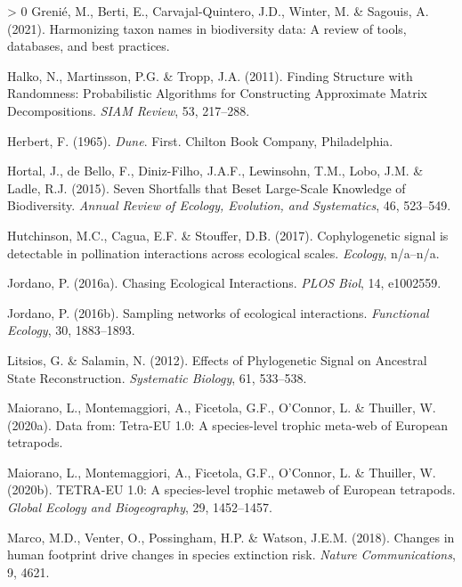 \documentclass[10pt,oneside]{article}
\newlength{\cslhangindent}
\newenvironment{CSLReferences}[3] %
 {%
  \setlength{\parindent}{0pt}
  \ifodd #1 \everypar{\setlength{\hangindent}{\cslhangindent}}\ignorespaces\fi
  \ifnum #2 > 0
  \setlength{\parskip}{#2\baselineskip}
  \fi
 }%
 {}
\begin{document}
\begin{CSLReferences}{1}{0}
\leavevmode\hypertarget{ref-Grenie2021HarTax}{}%
Grenié, M., Berti, E., Carvajal-Quintero, J.D., Winter, M. \& Sagouis,
A. (2021). Harmonizing taxon names in biodiversity data: A review of
tools, databases, and best practices.

\leavevmode\hypertarget{ref-Halko2011FinStr}{}%
Halko, N., Martinsson, P.G. \& Tropp, J.A. (2011). Finding Structure
with Randomness: Probabilistic Algorithms for Constructing Approximate
Matrix Decompositions. \emph{SIAM Review}, 53, 217--288.

\leavevmode\hypertarget{ref-Herbert1965Dun}{}%
Herbert, F. (1965). \emph{Dune}. First. Chilton Book Company,
Philadelphia.

\leavevmode\hypertarget{ref-Hortal2015SevSho}{}%
Hortal, J., de Bello, F., Diniz-Filho, J.A.F., Lewinsohn, T.M., Lobo,
J.M. \& Ladle, R.J. (2015). Seven Shortfalls that Beset Large-Scale
Knowledge of Biodiversity. \emph{Annual Review of Ecology, Evolution,
and Systematics}, 46, 523--549.

\leavevmode\hypertarget{ref-Hutchinson2017CopSig}{}%
Hutchinson, M.C., Cagua, E.F. \& Stouffer, D.B. (2017). Cophylogenetic
signal is detectable in pollination interactions across ecological
scales. \emph{Ecology}, n/a--n/a.

\leavevmode\hypertarget{ref-Jordano2016ChaEco}{}%
Jordano, P. (2016a). Chasing Ecological Interactions. \emph{PLOS Biol},
14, e1002559.

\leavevmode\hypertarget{ref-Jordano2016SamNet}{}%
Jordano, P. (2016b). Sampling networks of ecological interactions.
\emph{Functional Ecology}, 30, 1883--1893.

\leavevmode\hypertarget{ref-Litsios2012EffPhy}{}%
Litsios, G. \& Salamin, N. (2012). Effects of Phylogenetic Signal on
Ancestral State Reconstruction. \emph{Systematic Biology}, 61, 533--538.

\leavevmode\hypertarget{ref-Maiorano2020DatTet}{}%
Maiorano, L., Montemaggiori, A., Ficetola, G.F., O'Connor, L. \&
Thuiller, W. (2020a). Data from: Tetra-EU 1.0: A species-level trophic
meta-web of European tetrapods.

\leavevmode\hypertarget{ref-Maiorano2020TetEu}{}%
Maiorano, L., Montemaggiori, A., Ficetola, G.F., O'Connor, L. \&
Thuiller, W. (2020b). TETRA-EU 1.0: A species-level trophic metaweb of
European tetrapods. \emph{Global Ecology and Biogeography}, 29,
1452--1457.

\leavevmode\hypertarget{ref-Marco2018ChaHum}{}%
Marco, M.D., Venter, O., Possingham, H.P. \& Watson, J.E.M. (2018).
Changes in human footprint drive changes in species extinction risk.
\emph{Nature Communications}, 9, 4621.


\end{CSLReferences}
\end{document}
